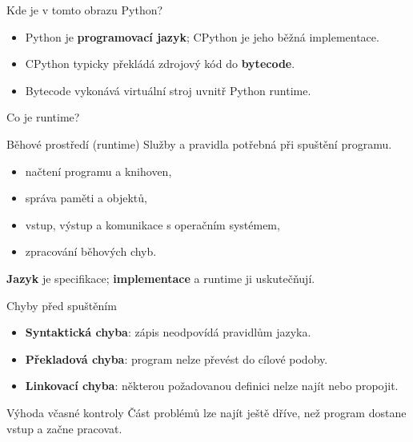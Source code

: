 \documentclass[aspectratio=169]{beamer}
\newcommand{\term}[1]{\textcolor{CodeBlue}{\textbf{#1}}}
\begin{document}
\begin{frame}{Kde je v tomto obrazu Python?}
  \begin{itemize}
    \item Python je \term{programovací jazyk}; CPython je jeho běžná implementace.
    \item CPython typicky překládá zdrojový kód do \term{bytecode}.
    \item Bytecode vykonává virtuální stroj uvnitř Python runtime.
  \end{itemize}
  \centering
  \vspace{0.5cm}
\end{frame}

\begin{frame}{Co je runtime?}
  \begin{block}{Běhové prostředí (runtime)}
    Služby a pravidla potřebná při spuštění programu.
  \end{block}
  \begin{itemize}
    \item načtení programu a knihoven,
    \item správa paměti a objektů,
    \item vstup, výstup a komunikace s operačním systémem,
    \item zpracování běhových chyb.
  \end{itemize}
  \vspace{0.3cm}
  \textbf{Jazyk} je specifikace; \textbf{implementace} a runtime ji uskutečňují.
\end{frame}

\begin{frame}{Chyby před spuštěním}
  \begin{itemize}
    \item \term{Syntaktická chyba}: zápis neodpovídá pravidlům jazyka.
    \item \term{Překladová chyba}: program nelze převést do cílové podoby.
    \item \term{Linkovací chyba}: některou požadovanou definici nelze najít nebo propojit.
  \end{itemize}
  \begin{block}{Výhoda včasné kontroly}
    Část problémů lze najít ještě dříve, než program dostane vstup a začne pracovat.
  \end{block}
\end{frame}
\end{document}
